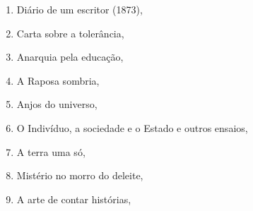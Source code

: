 \begin{multicols}{2}
\begin{enumerate}
\item Diário de um escritor (1873), {}
\item Carta sobre a tolerância, {}
\item Anarquia pela educação, {}
\item A Raposa sombria, {}
\item Anjos do universo, {}
\item O Indivíduo, a sociedade e o Estado e outros ensaios, {}
\item A terra uma só, {}
\item Mistério no morro do deleite, {}
\item A arte de contar histórias, {}
\end{enumerate}
\end{multicols}

\pagebreak